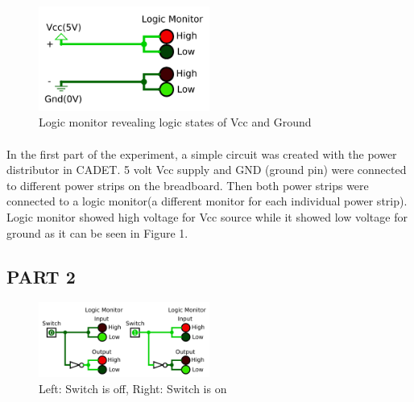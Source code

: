 \documentclass[pdftex,12pt,a4paper]{article}
\begin{document}
\begin{figure}[ht]
	\centering
	\includegraphics[width=0.5\textwidth]{part1_800.png}	
	\caption{Logic monitor revealing logic states of Vcc and Ground}
	\label{fig1}
\end{figure}
\begin{flushleft}
\paragraph{}
In the first part of the experiment, a simple circuit was created with the power distributor in CADET. 5 volt Vcc supply and GND (ground pin) were connected to different power strips on the breadboard. Then both power strips were connected to a logic monitor(a different monitor for each individual power strip). Logic monitor showed high voltage for Vcc source while it showed low voltage for ground as it can be seen in Figure 1.
\end{flushleft}


\begin{flushleft}
\subsection{PART 2}
\end{flushleft}

\begin{figure}[ht]
	\centering
	\includegraphics[width=0.5\textwidth]{part2_800.png}	
	\caption{Left: Switch is off, Right: Switch is on}
	\label{fig2}
\end{figure}
\end{document}
